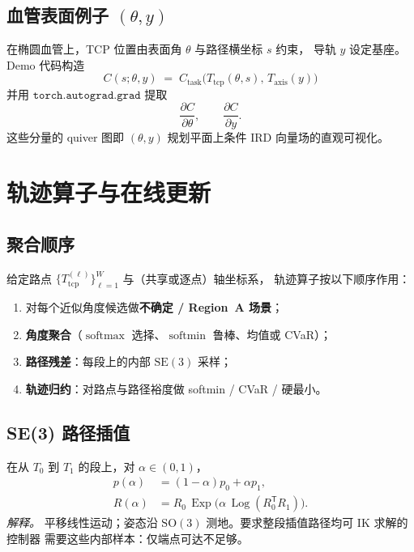 \documentclass[UTF8,a4paper,11pt,fontset=fandol]{ctexart}
\newcommand{\SE}{\mathrm{SE}}
\newcommand{\SO}{\mathrm{SO}}
\newcommand{\Tcp}{T_{\mathrm{tcp}}}
\newcommand{\Taxis}{T_{\mathrm{axis}}}
\newcommand{\softmin}{\operatorname{softmin}}
\newcommand{\softmax}{\operatorname{softmax}}
\begin{document}
\subsection{\texorpdfstring{血管表面例子 $(\theta,y)$}{血管表面例子 (theta, y)}}
\label{sec:vessel-grad}

在椭圆血管上，TCP 位置由表面角 \(\theta\) 与路径横坐标 \(s\) 约束，
导轨 \(y\) 设定基座。Demo 代码构造
\begin{equation}
\label{eq:demo-query}
  C(s;\theta,y)
  \;=\;
  C_{\mathrm{task}}\bigl(
    \Tcp(\theta,s),\,
    \Taxis(y)
  \bigr)
\end{equation}
并用 \(\mathtt{torch.autograd.grad}\) 提取
\begin{equation}
\label{eq:demo-grads}
  \frac{\partial C}{\partial\theta},
  \qquad
  \frac{\partial C}{\partial y}.
\end{equation}
这些分量的 quiver 图即 \((\theta,y)\) 规划平面上条件 IRD 向量场的直观可视化。

\section{轨迹算子与在线更新}
\label{sec:traj}

\subsection{聚合顺序}
\label{sec:agg-order}

给定路点 \(\{\Tcp^{(\ell)}\}_{\ell=1}^{W}\) 与（共享或逐点）轴坐标系，
轨迹算子按以下顺序作用：
\begin{enumerate}[leftmargin=1.6em]
  \item 对每个近似角度候选做\textbf{不确定 / Region~A 场景}；
  \item \textbf{角度聚合}（\(\softmax\) 选择、\(\softmin\) 鲁棒、均值或 CVaR）；
  \item \textbf{路径残差}：每段上的内部 \(\SE(3)\) 采样；
  \item \textbf{轨迹归约}：对路点与路径裕度做 softmin / CVaR / 硬最小。
\end{enumerate}

\subsection{SE(3) 路径插值}
\label{sec:se3-interp}

在从 \(T_{0}\) 到 \(T_{1}\) 的段上，对 \(\alpha\in(0,1)\)，
\begin{equation}
\label{eq:se3-interp}
\begin{aligned}
  p(\alpha)
  &=
  (1-\alpha)p_{0}+\alpha p_{1},
  \\
  R(\alpha)
  &=
  R_{0}\,
  \operatorname{Exp}\bigl(
    \alpha\,\operatorname{Log}(R_{0}^{\mathsf T}R_{1})
  \bigr).
\end{aligned}
\end{equation}
\emph{解释。}
平移线性运动；姿态沿 \(\SO(3)\) 测地。要求整段插值路径均可 IK 求解的控制器
需要这些内部样本：仅端点可达不足够。
\end{document}
